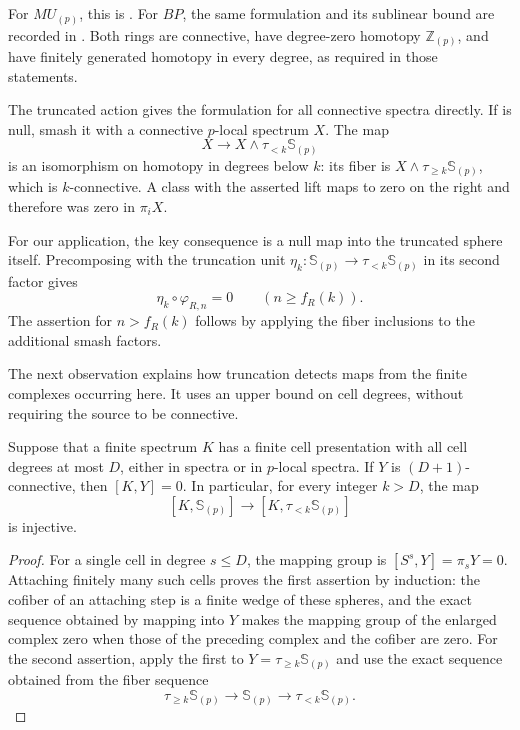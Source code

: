 For $MU_{(p)}$, this is
\cite[Definitions~2.28 and~3.26, Proposition~3.28, and
Theorem~3.30]{Mathew2018}.
For $BP$, the same formulation and its sublinear bound are recorded in
\cite[Definition~B.3, the discussion following Remark~B.4, and
Proposition~B.15]{BurklundHahnSenger2023}.
Both rings are connective, have degree-zero homotopy
$\mathbb Z_{(p)}$, and have finitely generated homotopy in every degree,
as required in those statements.

The truncated action gives the formulation for all connective spectra
directly.
If  is null, smash it with a
connective $p$-local spectrum $X$.  The map
\[
X\longrightarrow X\wedge\tau_{<k}\mathbb S_{(p)}
\]
is an isomorphism on homotopy in degrees below $k$: its fiber is
$X\wedge\tau_{\geq k}\mathbb S_{(p)}$, which is $k$-connective.
A class with the asserted lift maps to zero on the right and therefore
was zero in $\pi_iX$.

For our application, the key consequence is a null map into the
truncated sphere itself.  Precomposing
 with the truncation unit
$\eta_k:\mathbb S_{(p)}\to\tau_{<k}\mathbb S_{(p)}$ in its second
factor gives
\begin{equation}
\label{eq:nilpotence-truncated-composite}
\eta_k\circ\varphi_{R,n}=0
\qquad(n\geq f_R(k)).
\end{equation}
The assertion for $n>f_R(k)$ follows by
applying the fiber inclusions to the additional smash factors.

The next observation explains how truncation detects maps from the
finite complexes occurring here.  It uses an upper bound on cell
degrees, without requiring the source to be connective.

\begin{lemma}
\label{lem:cell-truncation}
Suppose that a finite spectrum $K$ has a finite cell presentation with
all cell degrees at most $D$, either in spectra or in $p$-local
spectra.  If $Y$ is $(D+1)$-connective, then
$[K,Y]=0$.  In particular, for every integer $k>D$, the map
\[
[K,\mathbb S_{(p)}]\longrightarrow
[K,\tau_{<k}\mathbb S_{(p)}]
\]
is injective.
\end{lemma}

\begin{proof}
For a single cell in degree $s\leq D$, the mapping group is
$[S^s,Y]=\pi_sY=0$.  Attaching finitely many such cells proves the
first assertion by induction: the cofiber of an attaching step is a
finite wedge of these spheres, and the exact sequence obtained by
mapping into $Y$ makes the mapping group of the enlarged complex zero
when those of the preceding complex and the cofiber are zero.
For the second assertion, apply the first to
$Y=\tau_{\geq k}\mathbb S_{(p)}$ and use the exact sequence obtained
from the fiber sequence
\[
\tau_{\geq k}\mathbb S_{(p)}\longrightarrow\mathbb S_{(p)}
 \longrightarrow\tau_{<k}\mathbb S_{(p)}.
\]
\end{proof}

